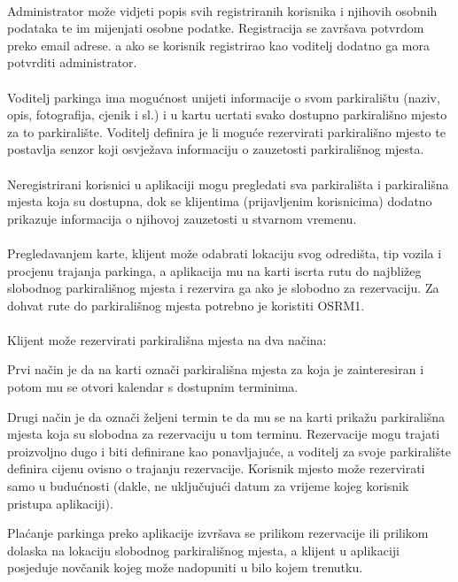 \paragraph*{}Administrator može vidjeti popis svih registriranih korisnika i njihovih osobnih podataka te im mijenjati osobne podatke. Registracija se završava potvrdom preko email adrese. a ako se korisnik registrirao kao voditelj dodatno ga mora potvrditi administrator.
\paragraph*{}{Voditelj parkinga ima mogućnost unijeti informacije o svom parkiralištu (naziv, opis, fotografija, cjenik i sl.) i u kartu ucrtati svako dostupno parkirališno mjesto za to parkiralište. Voditelj definira je li moguće rezervirati parkirališno mjesto te postavlja senzor koji osvježava informaciju o zauzetosti parkirališnog mjesta.}
\paragraph*{}{Neregistrirani korisnici u aplikaciji mogu pregledati sva parkirališta i parkirališna mjesta koja su dostupna, dok se klijentima (prijavljenim korisnicima) dodatno prikazuje informacija o njihovoj zauzetosti u stvarnom vremenu.}
\paragraph*{}{Pregledavanjem karte, klijent može odabrati lokaciju svog odredišta, tip vozila i procjenu trajanja parkinga, a aplikacija mu na karti iscrta rutu do najbližeg slobodnog parkirališnog mjesta i rezervira ga ako je slobodno za rezervaciju. Za dohvat rute do parkirališnog mjesta potrebno je koristiti OSRM1.}

\paragraph*{}Klijent može rezervirati parkirališna mjesta na dva načina:
\begin{packed_item}
	\item{
		Prvi način je da na karti označi parkirališna mjesta za koja je zainteresiran i potom mu se otvori kalendar s dostupnim terminima.
	}
	\item{
		Drugi način je da označi željeni termin te da mu se na karti prikažu parkirališna mjesta koja su slobodna za rezervaciju u tom terminu. Rezervacije mogu trajati proizvoljno dugo i biti definirane kao ponavljajuće, a voditelj za svoje parkiralište definira cijenu ovisno o trajanju rezervacije. Korisnik mjesto može rezervirati samo u budućnosti (dakle, ne uključujući datum za vrijeme kojeg korisnik pristupa aplikaciji).
	}
\end{packed_item}


Plaćanje parkinga preko aplikacije izvršava se prilikom rezervacije ili prilikom dolaska na lokaciju slobodnog parkirališnog mjesta, a klijent u aplikaciji posjeduje novčanik kojeg može nadopuniti u bilo kojem trenutku.




\eject

